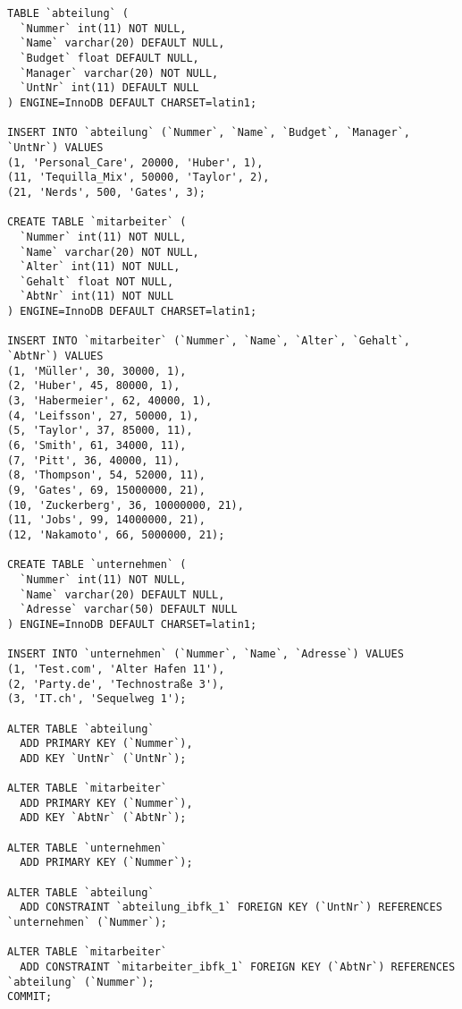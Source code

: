 \documentclass{lehramt-informatik-aufgabe}
\begin{document}
\begin{verbatim}
TABLE `abteilung` (
  `Nummer` int(11) NOT NULL,
  `Name` varchar(20) DEFAULT NULL,
  `Budget` float DEFAULT NULL,
  `Manager` varchar(20) NOT NULL,
  `UntNr` int(11) DEFAULT NULL
) ENGINE=InnoDB DEFAULT CHARSET=latin1;

INSERT INTO `abteilung` (`Nummer`, `Name`, `Budget`, `Manager`, `UntNr`) VALUES
(1, 'Personal_Care', 20000, 'Huber', 1),
(11, 'Tequilla_Mix', 50000, 'Taylor', 2),
(21, 'Nerds', 500, 'Gates', 3);

CREATE TABLE `mitarbeiter` (
  `Nummer` int(11) NOT NULL,
  `Name` varchar(20) NOT NULL,
  `Alter` int(11) NOT NULL,
  `Gehalt` float NOT NULL,
  `AbtNr` int(11) NOT NULL
) ENGINE=InnoDB DEFAULT CHARSET=latin1;

INSERT INTO `mitarbeiter` (`Nummer`, `Name`, `Alter`, `Gehalt`, `AbtNr`) VALUES
(1, 'Müller', 30, 30000, 1),
(2, 'Huber', 45, 80000, 1),
(3, 'Habermeier', 62, 40000, 1),
(4, 'Leifsson', 27, 50000, 1),
(5, 'Taylor', 37, 85000, 11),
(6, 'Smith', 61, 34000, 11),
(7, 'Pitt', 36, 40000, 11),
(8, 'Thompson', 54, 52000, 11),
(9, 'Gates', 69, 15000000, 21),
(10, 'Zuckerberg', 36, 10000000, 21),
(11, 'Jobs', 99, 14000000, 21),
(12, 'Nakamoto', 66, 5000000, 21);

CREATE TABLE `unternehmen` (
  `Nummer` int(11) NOT NULL,
  `Name` varchar(20) DEFAULT NULL,
  `Adresse` varchar(50) DEFAULT NULL
) ENGINE=InnoDB DEFAULT CHARSET=latin1;

INSERT INTO `unternehmen` (`Nummer`, `Name`, `Adresse`) VALUES
(1, 'Test.com', 'Alter Hafen 11'),
(2, 'Party.de', 'Technostraße 3'),
(3, 'IT.ch', 'Sequelweg 1');

ALTER TABLE `abteilung`
  ADD PRIMARY KEY (`Nummer`),
  ADD KEY `UntNr` (`UntNr`);

ALTER TABLE `mitarbeiter`
  ADD PRIMARY KEY (`Nummer`),
  ADD KEY `AbtNr` (`AbtNr`);

ALTER TABLE `unternehmen`
  ADD PRIMARY KEY (`Nummer`);

ALTER TABLE `abteilung`
  ADD CONSTRAINT `abteilung_ibfk_1` FOREIGN KEY (`UntNr`) REFERENCES `unternehmen` (`Nummer`);

ALTER TABLE `mitarbeiter`
  ADD CONSTRAINT `mitarbeiter_ibfk_1` FOREIGN KEY (`AbtNr`) REFERENCES `abteilung` (`Nummer`);
COMMIT;
\end{verbatim}
\end{document}
